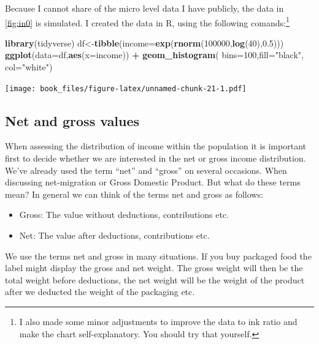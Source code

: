 \documentclass[]{book}
\newenvironment{Shaded}{\begin{snugshade}}{\end{snugshade}}
\newcommand{\DataTypeTok}[1]{\textcolor[rgb]{0.13,0.29,0.53}{#1}}
\newcommand{\DecValTok}[1]{\textcolor[rgb]{0.00,0.00,0.81}{#1}}
\newcommand{\FloatTok}[1]{\textcolor[rgb]{0.00,0.00,0.81}{#1}}
\newcommand{\KeywordTok}[1]{\textcolor[rgb]{0.13,0.29,0.53}{\textbf{#1}}}
\newcommand{\NormalTok}[1]{#1}
\newcommand{\OperatorTok}[1]{\textcolor[rgb]{0.81,0.36,0.00}{\textbf{#1}}}
\newcommand{\StringTok}[1]{\textcolor[rgb]{0.31,0.60,0.02}{#1}}
\providecommand{\tightlist}{%
  \setlength{\itemsep}{0pt}\setlength{\parskip}{0pt}}
\let\rmarkdownfootnote\footnote%
\def\footnote{\protect\rmarkdownfootnote}
\begin{document}
Because I cannot share of the micro level data I have publicly, the data in \ref{fig:in0} is simulated. I created the data in R, using the following comands:\footnote{I also made some minor adjustments to improve the data to ink ratio and make the chart self-explanatory. You should try that yourself.}

\begin{Shaded}
\begin{Highlighting}[]
\KeywordTok{library}\NormalTok{(tidyverse)}
\NormalTok{df<-}\KeywordTok{tibble}\NormalTok{(}\DataTypeTok{income=}\KeywordTok{exp}\NormalTok{(}\KeywordTok{rnorm}\NormalTok{(}\DecValTok{100000}\NormalTok{,}\KeywordTok{log}\NormalTok{(}\DecValTok{40}\NormalTok{),}\FloatTok{0.5}\NormalTok{)))}
\KeywordTok{ggplot}\NormalTok{(}\DataTypeTok{data=}\NormalTok{df,}\KeywordTok{aes}\NormalTok{(}\DataTypeTok{x=}\NormalTok{income)) }\OperatorTok{+}\StringTok{ }
\StringTok{  }\KeywordTok{geom_histogram}\NormalTok{( }\DataTypeTok{bins=}\DecValTok{100}\NormalTok{,}\DataTypeTok{fill=}\StringTok{"black"}\NormalTok{, }\DataTypeTok{col=}\StringTok{"white"}\NormalTok{)}
\end{Highlighting}
\end{Shaded}

\texttt{[image: book\_files/figure-latex/unnamed-chunk-21-1.pdf]}

\hypertarget{net-and-gross-values}{%
\subsection{Net and gross values}\label{net-and-gross-values}}

When assessing the distribution of income within the population it is important first to decide whether we are interested in the net or gross income distribution. We've already used the term ``net'' and ``gross'' on several occasions. When discussing net-migration or Gross Domestic Product. But what do these terms mean? In general we can think of the terms net and gross as follows:

\begin{itemize}
\tightlist
\item
  Gross: The value without deductions, contributions etc.
\item
  Net: The value after deductions, contributions etc.
\end{itemize}

We use the terms net and gross in many situations. If you buy packaged food the label might display the gross and net weight. The gross weight will then be the total weight before deductions, the net weight will be the weight of the product after we deducted the weight of the packaging etc.
\end{document}
